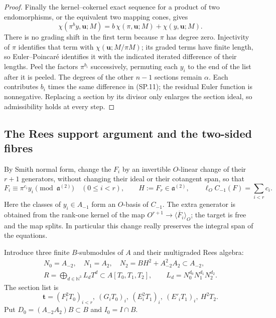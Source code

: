 \begin{proof}
Finally the kernel--cokernel exact sequence for a product of two
endomorphisms, or the equivalent two mapping cones, gives
\[
 \chi(\pi^b y,\mathbf u;M)
       =b\,\chi(\pi,\mathbf u;M)+\chi(y,\mathbf u;M).
 \tag{SP.13}
\]
There is no grading shift in the first term because $\pi$ has degree
zero.  Injectivity of $\pi$ identifies that term with
$\chi(\mathbf u;M/\pi M)$; its graded terms have finite length, so
Euler--Poincar\'e identifies it with the indicated iterated difference
of their lengths.  Peel the factors $\pi^{b_i}$ successively,
permuting each $y_i$ to the end of the list after it is peeled.  The
degrees of the other $n-1$ sections remain $\alpha$.  Each contributes
$b_i$ times the same difference in (SP.11); the residual Euler
function is nonnegative.  Replacing a section by its divisor only
enlarges the section ideal, so admissibility holds at every step.
\end{proof}

\subsection{The Rees support argument and the two-sided fibres}

By Smith normal form, change the $F_i$ by an invertible $O$-linear
change of their $r+1$ generators, without changing their ideal or
their cotangent span, so that
\[
 F_i\equiv\pi^{c_i}y_i\pmod{\mathfrak a^{(2)}}\quad(0\le i<r),
 \qquad H:=F_r\in\mathfrak a^{(2)},\qquad
 \ell_OC_{-1}(F)=\sum_{i<r}c_i .
 \tag{SP.14}
\]
Here the classes of $y_i\in A_{-1}$ form an $O$-basis of $C_{-1}$.
The extra generator is obtained from the rank-one kernel of the map
$O^{r+1}\to\langle\overline F_i\rangle_O$; the target is free and
the map splits.  In particular this change really preserves the
integral span of the equations.

Introduce three finite $B$-submodules of $A$ and their multigraded
Rees algebra:
\[
 \begin{gathered}
 N_0=A_{-2},\quad N_1=A_2,\quad
 N_2=BH^2+A_{-2}^2A_2\subset A_{-2},\\
 R=\bigoplus_{d\in\mathbb N^3}L_dT^d\subset A[T_0,T_1,T_2],
 \qquad L_d=N_0^{d_0}N_1^{d_1}N_2^{d_2}.
 \end{gathered}
 \tag{SP.15}
\]
The section list is
\[
 \mathbf t=(F_i^2T_0)_{i<r},\ (G_iT_0)_i,\
                  (E_i^2T_1)_i,\ (E'_iT_1)_i,\ H^2T_2.
 \tag{SP.16}
\]
Put $D_0=(A_{-2}A_2)B\subset B$ and $I_0=I\cap B$.

